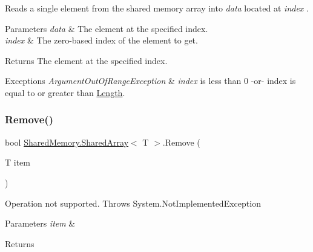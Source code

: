 Reads a single element from the shared memory array into {\itshape data}  located at {\itshape index} . 


\begin{DoxyParams}{Parameters}
{\em data} & The element at the specified index.\\
\hline
{\em index} & The zero-\/based index of the element to get.\\
\hline
\end{DoxyParams}
\begin{DoxyReturn}{Returns}
The element at the specified index.
\end{DoxyReturn}

\begin{DoxyExceptions}{Exceptions}
{\em Argument\+Out\+Of\+Range\+Exception} & {\itshape index}  is less than 0 -\/or-\/ index is equal to or greater than \hyperlink{class_shared_memory_1_1_shared_array_a0fc7647fef708e12caf94e7be58f2c3c}{Length}.\\
\hline
\end{DoxyExceptions}
\mbox{\label{class_shared_memory_1_1_shared_array_a55165b2d571610b4806536a6ed55d877}} 
\subsubsection{\texorpdfstring{Remove()}{Remove()}}
{\footnotesize\ttfamily bool \hyperlink{class_shared_memory_1_1_shared_array}{Shared\+Memory.\+Shared\+Array}$<$ T $>$.Remove (\begin{DoxyParamCaption}\item[{T}]{item }\end{DoxyParamCaption})\hspace{0.3cm}{\ttfamily [inline]}}



Operation not supported. Throws System.\+Not\+Implemented\+Exception 


\begin{DoxyParams}{Parameters}
{\em item} & \\
\hline
\end{DoxyParams}
\begin{DoxyReturn}{Returns}

\end{DoxyReturn}
\mbox{\label{class_shared_memory_1_1_shared_array_ad57a17abd0897ec919089dd82dff8b58}} 
